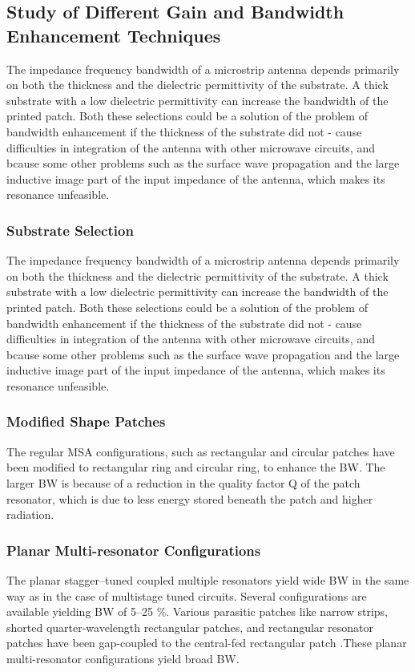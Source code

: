 \documentclass[12pt]{article}
\begin{document}
		          \subsection{Study of Different Gain and Bandwidth Enhancement Techniques}
		           \justify
		            The impedance frequency bandwidth of a microstrip antenna depends primarily on both the thickness and the dielectric permittivity of the substrate. A thick substrate with a low dielectric permittivity can increase the bandwidth of the printed patch. Both these selections could be a solution of the problem of bandwidth enhancement if the thickness of the substrate did not - cause difficulties in integration of the antenna with other microwave circuits, and  bcause some other problems such as the surface wave propagation and the large inductive image part of the input impedance of the antenna, which makes its resonance unfeasible. 
			            \subsubsection{ Substrate Selection}
			             \justify
			              The impedance frequency bandwidth of a microstrip antenna depends primarily on both the thickness and the dielectric permittivity of the substrate. A thick substrate with a low dielectric permittivity can increase the bandwidth of the printed patch. Both these selections could be a solution of the problem of bandwidth enhancement if the thickness of the substrate did not - cause difficulties in integration of the antenna with other microwave circuits, and  bcause some other problems such as the surface wave propagation and the large inductive image part of the input impedance of the antenna, which makes its resonance unfeasible.\\ 
			           \subsubsection{Modified Shape Patches}
			             \justify
			              The regular MSA configurations, such as rectangular and circular patches have been modified to rectangular ring and circular ring, to enhance the BW. The larger BW is because of a reduction in the quality factor Q of the patch resonator, which is due to less energy stored beneath the patch and higher radiation.\\
			            \subsubsection{ Planar Multi-resonator Configurations}
	 			            \justify
				             The planar stagger–tuned coupled multiple resonators yield wide BW in the same way as in the case of multistage tuned circuits. Several configurations are available yielding BW of 5–25 \%. Various parasitic patches like narrow strips, shorted quarter-wavelength rectangular patches, and rectangular resonator patches have been gap-coupled to the central-fed rectangular patch .These planar multi-resonator configurations yield broad BW.
\end{document}
